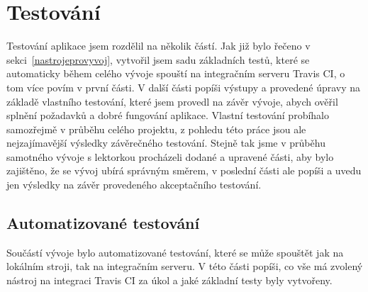 \chapter{Testování}\label{testovani}
    Testování aplikace jsem rozdělil na několik částí. Jak již bylo řečeno v sekci~\ref{nastrojeprovyvoj}, vytvořil jsem sadu základních testů, které se automaticky během celého vývoje spouští na integračním serveru Travis CI, o tom více povím v první části. V další části popíši výstupy a provedené úpravy na základě vlastního testování, které jsem provedl na závěr vývoje, abych ověřil splnění požadavků a dobré fungování aplikace. Vlastní testování probíhalo samozřejmě v průběhu celého projektu, z pohledu této práce jsou ale nejzajímavější výsledky závěrečného testování. Stejně tak jsme v průběhu samotného vývoje s lektorkou procházeli dodané a upravené části, aby bylo zajištěno, že se vývoj ubírá správným směrem, v poslední části ale popíši a uvedu jen výsledky na závěr provedeného akceptačního testování. 

    \section{Automatizované testování}\label{sec:automatizovaneTestovani}
    Součástí vývoje bylo automatizované testování, které se může spouštět jak na lokálním stroji, tak na integračním serveru. V této části popíši, co vše má zvolený nástroj na integraci Travis CI za úkol a jaké základní testy byly vytvořeny.
    
